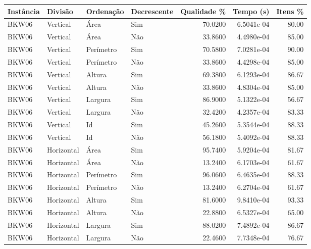 \begin{tabular}{llllrrr}
    \hline
    Instância & Divisão     & Ordenação & Decrescente & Qualidade \% & Tempo (s)  & Itens \% \\
    \hline
    BKW06     & Vertical    & Área      & Sim         & 70.0200      & 6.5041e-04 & 80.00    \\
    BKW06     & Vertical    & Área      & Não         & 33.8600      & 4.4980e-04 & 85.00    \\
    BKW06     & Vertical    & Perímetro & Sim         & 70.5800      & 7.0281e-04 & 90.00    \\
    BKW06     & Vertical    & Perímetro & Não         & 33.8600      & 4.4298e-04 & 85.00    \\
    BKW06     & Vertical    & Altura    & Sim         & 69.3800      & 6.1293e-04 & 86.67    \\
    BKW06     & Vertical    & Altura    & Não         & 33.8600      & 4.8304e-04 & 85.00    \\
    BKW06     & Vertical    & Largura   & Sim         & 86.9000      & 5.1322e-04 & 56.67    \\
    BKW06     & Vertical    & Largura   & Não         & 32.4200      & 4.2357e-04 & 83.33    \\
    BKW06     & Vertical    & Id        & Sim         & 45.2600      & 5.3544e-04 & 88.33    \\
    BKW06     & Vertical    & Id        & Não         & 56.1800      & 5.4092e-04 & 88.33    \\
    BKW06     & Horizontal  & Área      & Sim         & 95.7400      & 5.9204e-04 & 81.67    \\
    BKW06     & Horizontal  & Área      & Não         & 13.2400      & 6.1703e-04 & 61.67    \\
    BKW06     & Horizontal  & Perímetro & Sim         & 96.0600      & 6.4635e-04 & 88.33    \\
    BKW06     & Horizontal  & Perímetro & Não         & 13.2400      & 6.2704e-04 & 61.67    \\
    BKW06     & Horizontal  & Altura    & Sim         & 81.6000      & 9.8410e-04 & 93.33    \\
    BKW06     & Horizontal  & Altura    & Não         & 22.8800      & 6.5327e-04 & 65.00    \\
    BKW06     & Horizontal  & Largura   & Sim         & 88.0200      & 7.4892e-04 & 86.67    \\
    BKW06     & Horizontal  & Largura   & Não         & 22.4600      & 7.7348e-04 & 76.67    \\

\end{tabular}
